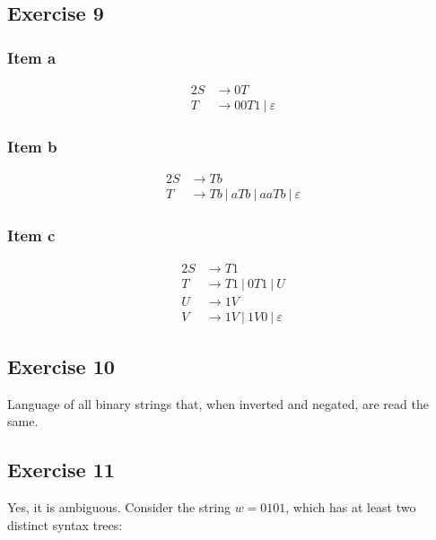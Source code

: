 {\subsection{Exercise 9}
\subsubsection{Item a}
\begin{alignat*}{2}
	S &\rightarrow 0T \\
	T &\rightarrow 00T1~|~\varepsilon
\end{alignat*}
\subsubsection{Item b}
\begin{alignat*}{2}
	S &\rightarrow Tb \\
	T &\rightarrow Tb~|~aTb~|~aaTb~|~\varepsilon
\end{alignat*}
\subsubsection{Item c}
\begin{alignat*}{2}
	S &\rightarrow T1 \\
	T &\rightarrow T1~|~0T1~|~U \\
	U &\rightarrow 1V \\
	V &\rightarrow 1V~|~1V0~|~\varepsilon
\end{alignat*}
\subsection{Exercise 10}
Language of all binary strings that, when inverted and negated, are read the same.
\subsection{Exercise 11}
Yes, it is ambiguous. Consider the string $w=0101$, which has at least two distinct syntax trees:\\
\begin{minipage}[t]{0.49\textwidth}
\begin{center}
\end{center}
\end{minipage}%
\begin{minipage}[t]{0.49\textwidth}
\begin{center}
\end{center}
\end{minipage}
}

